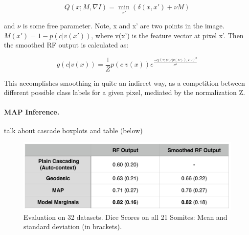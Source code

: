 \documentclass[10pt,twocolumn,letterpaper]{article}
\begin{document}
\[ Q(x; M, \nabla I) = \min_{x'} (\delta (x,x') + \nu M) \]

and $\nu$ is some free parameter.  Note, x and x' are two points in the image. $M(x') = 1 - p(c|v(x'))$, where v(x') is the feature vector at pixel x'.  Then the smoothed RF output is calculated as:

\[ g(c|v(x)) = \frac{1}{Z} p(c|v(x)) e^{\frac{-Q(x;p(c|v(\Omega)),\nabla J)^2}{\sigma ^2}} \]

This accomplishes smoothing in quite an indirect way, as a competition between different possible class labels for a given pixel, mediated by the normalization Z.  

\paragraph{MAP Inference. }


talk about cascade boxplots and table (below)

\begin{figure}[t]
\begin{center}
\includegraphics[width=\columnwidth]{TableDiceScores_2columns_noGeoF2.jpg} %
\caption{Evaluation on 32 datasets. Dice Scores on all 21 Somites: Mean and standard deviation (in brackets).}
\label{tab:results}
\end{center}
\end{figure}
\end{document}
